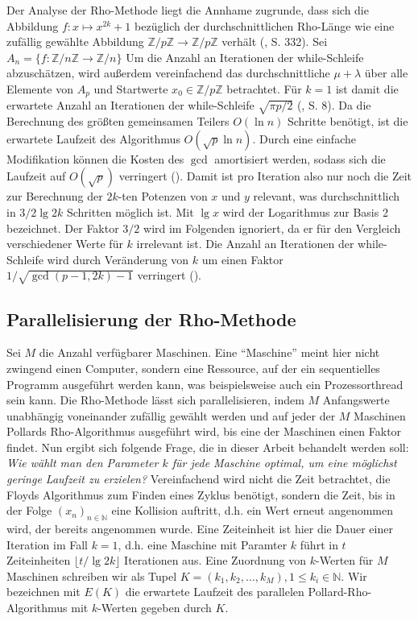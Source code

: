 \documentclass[a4paper, 10pt, ngerman]{article}
\newcommand{\N}{\mathbb{N}}
\newcommand{\Z}{\mathbb{Z}}
\begin{document}
\noindent Der Analyse der Rho-Methode liegt die Annhame zugrunde, dass sich die Abbildung $f : x \mapsto x^{2k} + 1$ bezüglich der durchschnittlichen Rho-Länge wie eine zufällig gewählte Abbildung $\Z/p\Z \to \Z/p\Z$ verhält (\cite{pol75}, S. 332). Sei $A_n = \{f : \Z/n\Z \to \Z/n\}$ Um die Anzahl an Iterationen der while-Schleife abzuschätzen, wird außerdem vereinfachend das durchschnittliche $\mu + \lambda$ über alle Elemente von $A_p$ und Startwerte $x_0 \in \Z/p\Z$ betrachtet. Für $k = 1$ ist damit die erwartete Anzahl an Iterationen der while-Schleife $\sqrt{\pi p / 2}$ (\cite{knu98}, S. 8). Da die Berechnung des größten gemeinsamen Teilers $O(\ln n)$ Schritte benötigt, ist die erwartete Laufzeit des Algorithmus $O(\sqrt p \ln n)$. Durch eine einfache Modifikation können die Kosten des $\gcd$ amortisiert werden, sodass sich die Laufzeit auf $O(\sqrt p)$ verringert (\cite{bre80}). Damit ist pro Iteration also nur noch die Zeit zur Berechnung der $2k$-ten Potenzen von $x$ und $y$ relevant, was durchschnittlich in $3/2 \lg 2k$ Schritten möglich ist. Mit $\lg x$ wird der Logarithmus zur Basis 2 bezeichnet. Der Faktor $3/2$ wird im Folgenden ignoriert, da er für den Vergleich verschiedener Werte für $k$ irrelevant ist. Die Anzahl an Iterationen der while-Schleife wird durch Veränderung von $k$ um einen Faktor $1/\sqrt{\gcd(p - 1, 2k) - 1}$ verringert (\cite{bp81}).

\subsection{Parallelisierung der Rho-Methode}

Sei $M$ die Anzahl verfügbarer Maschinen. Eine "`Maschine"'  meint hier nicht zwingend einen Computer, sondern eine Ressource, auf der ein sequentielles Programm ausgeführt werden kann, was beispielsweise auch ein Prozessorthread sein kann. Die Rho-Methode lässt sich parallelisieren, indem $M$ Anfangswerte unabhängig voneinander zufällig gewählt werden und auf jeder der $M$ Maschinen Pollards Rho-Algorithmus ausgeführt wird, bis eine der Maschinen einen Faktor findet. Nun ergibt sich folgende Frage, die in dieser Arbeit behandelt werden soll: \emph{Wie wählt man den Parameter $k$ für jede Maschine optimal, um eine möglichst geringe Laufzeit zu erzielen?} Vereinfachend wird nicht die Zeit betrachtet, die Floyds Algorithmus zum Finden eines Zyklus benötigt, sondern die Zeit, bis in der Folge $(x_n)_{n \in \N}$ eine Kollision auftritt, d.h. ein Wert erneut angenommen wird, der bereits angenommen wurde. Eine Zeiteinheit ist hier die Dauer einer Iteration im Fall $k = 1$, d.h. eine Maschine mit Paramter $k$ führt in $t$ Zeiteinheiten $\lfloor t / \lg 2k \rfloor$ Iterationen aus. Eine Zuordnung von $k$-Werten für $M$ Maschinen schreiben wir als Tupel $K = (k_1, k_2, \dots, k_M), 1 \le k_i \in \N$.  Wir bezeichnen mit $E(K)$ die erwartete Laufzeit des parallelen Pollard-Rho-Algorithmus mit $k$-Werten gegeben durch $K$.
\end{document}
